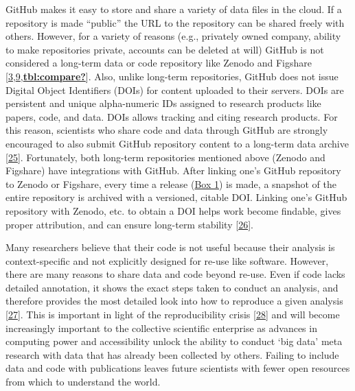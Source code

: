 GitHub makes it easy to store and share a variety of data files in the cloud.
If a repository is made ``public'' the URL to the repository can be shared freely with others.
However, for a variety of reasons (e.g., privately owned company, ability to make repositories private, accounts can be deleted at will) GitHub is not considered a long-term data or code repository like Zenodo and Figshare {[}\protect\hyperlink{ref-10ghgV3S8}{3},\protect\hyperlink{ref-kEX5dgzK}{9},\protect\hyperlink{ref-tbl:compare}{\textbf{tbl:compare?}}{]}.
Also, unlike long-term repositories, GitHub does not issue Digital Object Identifiers (DOIs) for content uploaded to their servers.
DOIs are persistent and unique alpha-numeric IDs assigned to research products like papers, code, and data.
DOIs allows tracking and citing research products.
For this reason, scientists who share code and data through GitHub are strongly encouraged to also submit GitHub repository content to a long-term data archive {[}\protect\hyperlink{ref-1Du6fzB8g}{25}{]}.
Fortunately, both long-term repositories mentioned above (Zenodo and Figshare) have integrations with GitHub.
After linking one's GitHub repository to Zenodo or Figshare, every time a release (\protect\hyperlink{definitions}{Box 1}) is made, a snapshot of the entire repository is archived with a versioned, citable DOI.
Linking one's GitHub repository with Zenodo, etc. to obtain a DOI helps work become findable, gives proper attribution, and can ensure long-term stability {[}\protect\hyperlink{ref-iIEKCTLU}{26}{]}.

Many researchers believe that their code is not useful because their analysis is context-specific and not explicitly designed for re-use like software.
However, there are many reasons to share data and code beyond re-use.
Even if code lacks detailed annotation, it shows the exact steps taken to conduct an analysis, and therefore provides the most detailed look into how to reproduce a given analysis {[}\protect\hyperlink{ref-uBJwnPbq}{27}{]}.
This is important in light of the reproducibility crisis {[}\protect\hyperlink{ref-1HZdsK5Kn}{28}{]} and will become increasingly important to the collective scientific enterprise as advances in computing power and accessibility unlock the ability to conduct `big data' meta research with data that has already been collected by others.
Failing to include data and code with publications leaves future scientists with fewer open resources from which to understand the world.

